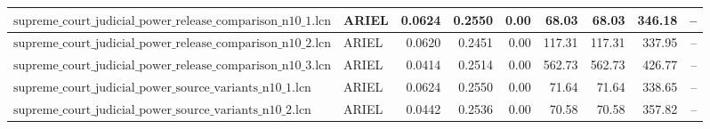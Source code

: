 \begin{table}[ht]
\begin{tabular}{llrrrrrrr}
$\text{supreme\_court\_judicial\_power\_release\_comparison\_n10\_1.lcn}$ & ARIEL & 0.0624 & 0.2550 & 0.00 & 68.03 & 68.03 & 346.18 & -- \\
\hline
$\text{supreme\_court\_judicial\_power\_release\_comparison\_n10\_2.lcn}$ & ARIEL & 0.0620 & 0.2451 & 0.00 & 117.31 & 117.31 & 337.95 & -- \\
\hline
$\text{supreme\_court\_judicial\_power\_release\_comparison\_n10\_3.lcn}$ & ARIEL & 0.0414 & 0.2514 & 0.00 & 562.73 & 562.73 & 426.77 & -- \\
\hline
$\text{supreme\_court\_judicial\_power\_source\_variants\_n10\_1.lcn}$ & ARIEL & 0.0624 & 0.2550 & 0.00 & 71.64 & 71.64 & 338.65 & -- \\
\hline
$\text{supreme\_court\_judicial\_power\_source\_variants\_n10\_2.lcn}$ & ARIEL & 0.0442 & 0.2536 & 0.00 & 70.58 & 70.58 & 357.82 & -- \\
\bottomrule
\end{tabular}
\end{table}
